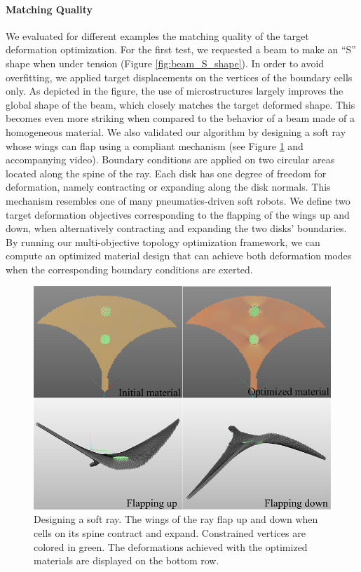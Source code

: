 \paragraph{Matching Quality}
	We evaluated for different examples the matching quality of the target deformation optimization.
	For the first test, we requested a beam to make an ``S'' shape when under tension (Figure \ref{fig:beam_S_shape}). In order to avoid overfitting, we applied target displacements on the vertices of the boundary cells only. As depicted in the figure, the use of microstructures largely improves the global shape of the beam, which closely matches the target deformed shape. This becomes even more striking when compared to the behavior of a beam made of a homogeneous material.
	We also validated our algorithm by designing a soft ray whose wings can flap using a compliant mechanism (see Figure \ref{fig:ray} and accompanying video). Boundary conditions are applied on two circular areas located along the spine of the ray. Each disk has one degree of freedom for deformation, namely contracting or expanding along the disk normals.
	This mechanism resembles one of many pneumatics-driven soft robots. We define two target deformation objectives corresponding to the flapping of the wings up and down, when alternatively contracting and expanding the two disks' boundaries. By running our multi-objective topology optimization framework, we can compute an optimized material design that can achieve both deformation modes when the corresponding boundary conditions are exerted.

\begin{figure}
	\centering
	\includegraphics[width=.6\linewidth]{images/ray.png}
	\caption{Designing a soft ray. The wings of the ray flap up and down when cells on its spine contract and expand.
	Constrained vertices are colored in green.
	The deformations achieved with the optimized materials are displayed on the bottom row.}
	\label{fig:ray}
\end{figure}
